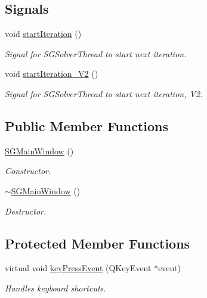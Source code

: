 \subsection*{Signals}
\begin{DoxyCompactItemize}
\item 
\mbox{\label{classSGMainWindow_a1abe4b80ca1554d9863e53323e91847e}} 
void \hyperlink{classSGMainWindow_a1abe4b80ca1554d9863e53323e91847e}{start\+Iteration} ()
\begin{DoxyCompactList}\small\item\em Signal for S\+G\+Solver\+Thread to start next iteration. \end{DoxyCompactList}\item 
\mbox{\label{classSGMainWindow_a155a779b9a5baace6092787bea27d459}} 
void \hyperlink{classSGMainWindow_a155a779b9a5baace6092787bea27d459}{start\+Iteration\+\_\+\+V2} ()
\begin{DoxyCompactList}\small\item\em Signal for S\+G\+Solver\+Thread to start next iteration, V2. \end{DoxyCompactList}\end{DoxyCompactItemize}
\subsection*{Public Member Functions}
\begin{DoxyCompactItemize}
\item 
\hyperlink{classSGMainWindow_af2c1eed12335e81fbbf403557d410d28}{S\+G\+Main\+Window} ()
\begin{DoxyCompactList}\small\item\em Constructor. \end{DoxyCompactList}\item 
\hyperlink{classSGMainWindow_a38e9f6d5431f6b92c898089582b7d124}{$\sim$\+S\+G\+Main\+Window} ()
\begin{DoxyCompactList}\small\item\em Destructor. \end{DoxyCompactList}\end{DoxyCompactItemize}
\subsection*{Protected Member Functions}
\begin{DoxyCompactItemize}
\item 
\mbox{\label{classSGMainWindow_a18bba6bdcde9ec59d0b0cd383b03980c}} 
virtual void \hyperlink{classSGMainWindow_a18bba6bdcde9ec59d0b0cd383b03980c}{key\+Press\+Event} (Q\+Key\+Event $\ast$event)
\begin{DoxyCompactList}\small\item\em Handles keyboard shortcuts. \end{DoxyCompactList}\end{DoxyCompactItemize}
